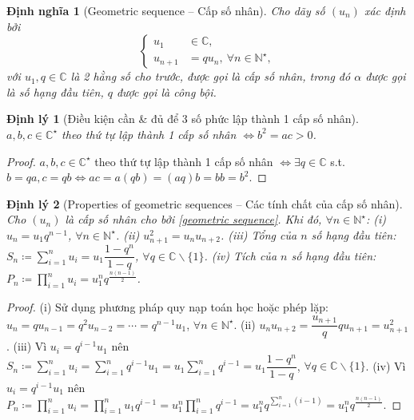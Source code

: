 \documentclass{article}
\newtheorem{dinhly}{Định lý}
\newtheorem{dinhnghia}{Định nghĩa}
\begin{document}
\begin{dinhnghia}[Geometric sequence -- Cấp số nhân]
	Cho dãy số $(u_n)$ xác định bởi
	\begin{equation}
		\label{geometric sequence}
		\tag{csn}
		\left\{\begin{split}
			u_1&\in\mathbb{C},\\
			u_{n+1} &= qu_n,\ \forall n\in\mathbb{N}^\star,
		\end{split}\right.
	\end{equation}
	với $u_1,q\in\mathbb{C}$ là 2 hằng số cho trước, được gọi là {\rm cấp số nhân}, trong đó $\alpha$ được gọi là {\rm số hạng đầu tiên}, $q$ được gọi là {\rm công bội}.
\end{dinhnghia}

\begin{dinhly}[Điều kiện cần \& đủ để 3 số phức lập thành 1 cấp số nhân]
	$a,b,c\in\mathbb{C}^\star$ theo thứ tự lập thành 1 cấp số nhân $\Leftrightarrow b^2 = ac > 0$.
\end{dinhly}

\begin{proof}
	$a,b,c\in\mathbb{C}^\star$ theo thứ tự lập thành 1 cấp số nhân $\Leftrightarrow\exists q\in\mathbb{C}$ s.t. $b = qa,c = qb\Leftrightarrow ac = a(qb) = (aq)b = bb = b^2$.
\end{proof}

\begin{dinhly}[Properties of geometric sequences -- Các tính chất của cấp số nhân]
	\label{thm: properties of geometric sequences}
	Cho $(u_n)$ là cấp số nhân cho bởi \eqref{geometric sequence}. Khi đó, $\forall n\in\mathbb{N}^\star$: (i) $u_n = u_1q^{n-1}$, $\forall n\in\mathbb{N}^\star$. (ii) $u_{n+1}^2 = u_nu_{n+2}$. (iii) Tổng của $n$ số hạng đầu tiên: $S_n\coloneqq\sum_{i=1}^n u_i = u_1\dfrac{1 - q^n}{1 - q}$, $\forall q\in\mathbb{C}\backslash\{1\}$. (iv) Tích của $n$ số hạng đầu tiên: $P_n\coloneqq\prod_{i=1}^n u_i = u_1^nq^{\frac{n(n - 1)}{2}}$.
\end{dinhly}

\begin{proof}
	(i) Sử dụng phương pháp quy nạp toán học hoặc phép lặp: $u_n = qu_{n-1} = q^2u_{n-2} = \cdots = q^{n-1}u_1$, $\forall n\in\mathbb{N}^\star$. (ii) $u_nu_{n+2} = \dfrac{u_{n+1}}{q}qu_{n+1} = u_{n+1}^2$. (iii) Vì $u_i = q^{i-1}u_1$ nên $S_n\coloneqq\sum_{i=1}^n u_i = \sum_{i=1}^n q^{i-1}u_1 = u_1\sum_{i=1}^n q^{i-1} = u_1\dfrac{1 - q^n}{1 - q}$, $\forall q\in\mathbb{C}\backslash\{1\}$. (iv) Vì $u_i = q^{i-1}u_1$ nên $P_n\coloneqq\prod_{i=1}^n u_i = \prod_{i=1}^n u_1q^{i-1} = u_1^n \prod_{i=1}^n q^{i-1} = u_1^nq^{\sum_{i=1}^n (i - 1)} = u_1^nq^{\frac{n(n - 1)}{2}}$.
\end{proof}
\end{document}
